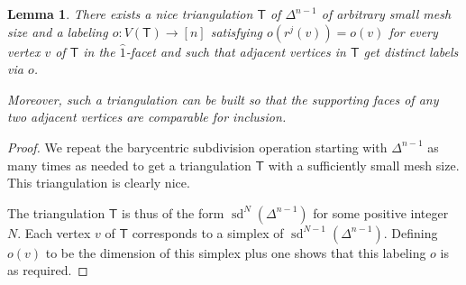 \documentclass[12pt]{amsart}
\newtheorem{lemma}{Lemma}
\theoremstyle{definition}
\theoremstyle{remark}
\def\T{\mathsf{T}}
\def\sd{\operatorname{sd}}
\def\sd{\operatorname{sd}}
\begin{document}
\begin{lemma}\label{lem:sym-own}
There exists a nice triangulation $\T$ of $\Delta^{n-1}$ of arbitrary small mesh size and a labeling $o\colon V(\T)\rightarrow[n]$ satisfying $o(r^j(v))=o(v)$ for every vertex $v$ of $\T$ in the $\widehat{1}$-facet and such that adjacent vertices in $\T$ get distinct labels via $o$.

Moreover, such a triangulation can be built so that the supporting faces of any two adjacent vertices are comparable for inclusion. 
\end{lemma}

\begin{proof}
We repeat the barycentric subdivision operation starting with $\Delta^{n-1}$ as many times as needed to get a triangulation $\T$ with a sufficiently small mesh size. This triangulation is clearly nice. 

The triangulation $\T$ is thus of the form $\sd^N\left(\Delta^{n-1}\right)$ for some positive integer $N$. Each vertex $v$ of $\T$ corresponds to a simplex of $\sd^{N-1}\left(\Delta^{n-1}\right)$. Defining $o(v)$ to be the dimension of this simplex plus one shows that this labeling $o$ is as required.
\end{proof}
\end{document}
